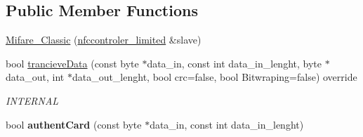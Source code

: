 \subsection*{Public Member Functions}
\begin{DoxyCompactItemize}
\item 
\hyperlink{class_mifare___classic_a91dc3f7490d536582dd5e584cbd6ed58}{Mifare\+\_\+\+Classic} (\hyperlink{classnfccontroler__limited}{nfccontroler\+\_\+limited} \&slave)
\item 
bool \hyperlink{class_mifare___classic_ac35863ec691f0a118156bea44c4cd7a7}{trancieve\+Data} (const byte $\ast$data\+\_\+in, const int data\+\_\+in\+\_\+lenght, byte $\ast$data\+\_\+out, int $\ast$data\+\_\+out\+\_\+lenght, bool crc=false, bool Bitwraping=false) override\hypertarget{class_mifare___classic_ac35863ec691f0a118156bea44c4cd7a7}{}\label{class_mifare___classic_ac35863ec691f0a118156bea44c4cd7a7}

\begin{DoxyCompactList}\small\item\em I\+N\+T\+E\+R\+N\+AL \end{DoxyCompactList}\item 
bool {\bfseries authent\+Card} (const byte $\ast$data\+\_\+in, const int data\+\_\+in\+\_\+lenght)\hypertarget{class_mifare___classic_aa39b8fbbb2b8a66f062c02a94a43c814}{}\label{class_mifare___classic_aa39b8fbbb2b8a66f062c02a94a43c814}


\end{DoxyCompactItemize}
